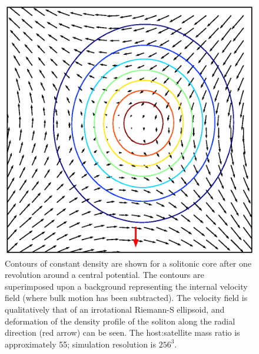 \documentclass[a4paper,11pt]{article}
\begin{document}
\begin{figure}
  \includegraphics[width=1.\textwidth,trim=1cm 1cm 0 1cm,clip]{riemann}
  \caption{Contours of constant density are shown for a solitonic core after one revolution around a central potential. The contours are superimposed upon a background representing the internal velocity field (where bulk motion has been subtracted). The velocity field is qualitatively that of an irrotational Riemann-S ellipsoid, and deformation of the density profile of the soliton along the radial direction (red arrow) can be seen. The host:satellite mass ratio is approximately 55; simulation resolution is $256^3$.}
  \label{fig:riemann}
\end{figure}
\end{document}
